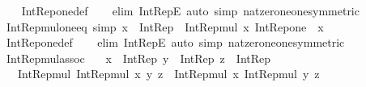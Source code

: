 \begin{isabellebody}
%
\isadelimproof
\ \ %
\endisadelimproof
%
\isatagproof
{}\isamarkupfalse%
\ Int{\isacharunderscore}{\kern0pt}Rep{\isacharunderscore}{\kern0pt}one{\isacharunderscore}{\kern0pt}def\isanewline
\ \ \isamarkupfalse%
\ {\isacharparenleft}{\kern0pt}elim\ Int{\isacharunderscore}{\kern0pt}RepE{\isacharparenright}{\kern0pt}\ {\isacharparenleft}{\kern0pt}auto\ simp{\isacharcolon}{\kern0pt}\ nat{\isacharunderscore}{\kern0pt}zero{\isacharunderscore}{\kern0pt}ne{\isacharunderscore}{\kern0pt}one{\isacharbrackleft}{\kern0pt}symmetric{\isacharbrackright}{\kern0pt}{\isacharparenright}{\kern0pt}%
\endisatagproof
{\isafoldproof}%
%
\isadelimproof
\isanewline
%
\endisadelimproof
\isanewline
{}\isamarkupfalse%
\ Int{\isacharunderscore}{\kern0pt}Rep{\isacharunderscore}{\kern0pt}mul{\isacharunderscore}{\kern0pt}one{\isacharunderscore}{\kern0pt}eq\ {\isacharbrackleft}{\kern0pt}simp{\isacharbrackright}{\kern0pt}{\isacharcolon}{\kern0pt}\ {\isachardoublequoteopen}x\ {\isacharcolon}{\kern0pt}\ Int{\isacharunderscore}{\kern0pt}Rep\ {\isasymLongrightarrow}\ Int{\isacharunderscore}{\kern0pt}Rep{\isacharunderscore}{\kern0pt}mul\ x\ Int{\isacharunderscore}{\kern0pt}Rep{\isacharunderscore}{\kern0pt}one\ {\isacharequal}{\kern0pt}\ x{\isachardoublequoteclose}\isanewline
%
\isadelimproof
\ \ %
\endisadelimproof
%
\isatagproof
{}\isamarkupfalse%
\ Int{\isacharunderscore}{\kern0pt}Rep{\isacharunderscore}{\kern0pt}one{\isacharunderscore}{\kern0pt}def\isanewline
\ \ \isamarkupfalse%
\ {\isacharparenleft}{\kern0pt}elim\ Int{\isacharunderscore}{\kern0pt}RepE{\isacharparenright}{\kern0pt}\ {\isacharparenleft}{\kern0pt}auto\ simp{\isacharcolon}{\kern0pt}\ nat{\isacharunderscore}{\kern0pt}zero{\isacharunderscore}{\kern0pt}ne{\isacharunderscore}{\kern0pt}one{\isacharbrackleft}{\kern0pt}symmetric{\isacharbrackright}{\kern0pt}{\isacharparenright}{\kern0pt}%
\endisatagproof
{\isafoldproof}%
%
\isadelimproof
\isanewline
%
\endisadelimproof
\isanewline
{}\isamarkupfalse%
\ Int{\isacharunderscore}{\kern0pt}Rep{\isacharunderscore}{\kern0pt}mul{\isacharunderscore}{\kern0pt}assoc{\isacharcolon}{\kern0pt}\isanewline
\ \ \ {\isachardoublequoteopen}x\ {\isacharcolon}{\kern0pt}\ Int{\isacharunderscore}{\kern0pt}Rep{\isachardoublequoteclose}\ {\isachardoublequoteopen}y\ {\isacharcolon}{\kern0pt}\ Int{\isacharunderscore}{\kern0pt}Rep{\isachardoublequoteclose}\ {\isachardoublequoteopen}z\ {\isacharcolon}{\kern0pt}\ Int{\isacharunderscore}{\kern0pt}Rep{\isachardoublequoteclose}\isanewline
\ \ \ {\isachardoublequoteopen}Int{\isacharunderscore}{\kern0pt}Rep{\isacharunderscore}{\kern0pt}mul\ {\isacharparenleft}{\kern0pt}Int{\isacharunderscore}{\kern0pt}Rep{\isacharunderscore}{\kern0pt}mul\ x\ y{\isacharparenright}{\kern0pt}\ z\ {\isacharequal}{\kern0pt}\ Int{\isacharunderscore}{\kern0pt}Rep{\isacharunderscore}{\kern0pt}mul\ x\ {\isacharparenleft}{\kern0pt}Int{\isacharunderscore}{\kern0pt}Rep{\isacharunderscore}{\kern0pt}mul\ y\ z{\isacharparenright}{\kern0pt}{\isachardoublequoteclose}\isanewline

\end{isabellebody}
